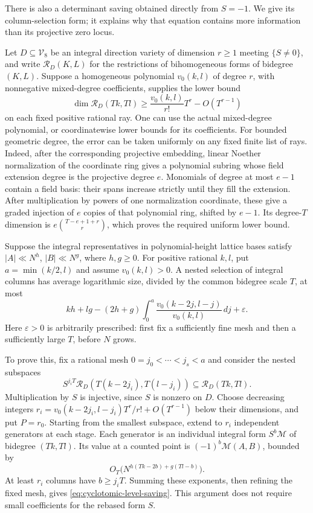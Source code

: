 There is also a determinant saving obtained directly from $S=-1$.
We give its column-selection form; it explains why that equation
contains more information than its projective zero locus.

Let $D\subseteq\mathcal V_8$ be an integral direction variety of
dimension $r\ge1$ meeting $\{S\ne0\}$, and write
$\mathcal R_D(K,L)$ for the restrictions of
bihomogeneous forms of bidegree $(K,L)$. Suppose a homogeneous
polynomial $v_0(k,l)$ of degree $r$, with nonnegative mixed-degree
coefficients, supplies the lower bound
\begin{equation}\label{eq:cyclotomic-volume-input}
 \dim\mathcal R_D(Tk,Tl)
 \ge\frac{v_0(k,l)}{r!}T^r-O(T^{r-1})
\end{equation}
on each fixed positive rational ray. One can use the actual
mixed-degree polynomial, or coordinatewise lower bounds for its
coefficients. For bounded geometric degree, the error can be taken
uniformly on any fixed finite list of rays. Indeed, after the
corresponding projective embedding, linear Noether normalization of
the coordinate ring gives a polynomial subring whose field extension
degree is the projective degree $e$. Monomials of degree at most
$e-1$ contain a field basis: their spans increase strictly until they
fill the extension. After multiplication by powers of one normalization
coordinate, these give a graded injection of $e$ copies of that
polynomial ring, shifted by $e-1$. Its degree-$T$ dimension is
$e\binom{T-e+1+r}{r}$, which proves the required uniform lower bound.

Suppose the integral representatives in polynomial-height lattice
bases satisfy $|A|\ll N^h$, $|B|\ll N^g$, where $h,g\ge0$.
For positive rational $k,l$, put $a=\min(k/2,l)$ and assume
$v_0(k,l)>0$. A nested selection of integral columns has average
logarithmic size, divided by the common bidegree scale $T$, at most
\begin{equation}\label{eq:cyclotomic-level-saving}
 kh+lg-(2h+g)\int_0^a
       \frac{v_0(k-2j,l-j)}{v_0(k,l)}\,dj+\varepsilon.
\end{equation}
Here $\varepsilon>0$ is arbitrarily prescribed: first fix a sufficiently
fine mesh and then a sufficiently large $T$, before $N$ grows.

To prove this, fix a rational mesh $0=j_0<\cdots<j_s<a$ and consider
the nested subspaces
\[
 S^{j_iT}\mathcal R_D(T(k-2j_i),T(l-j_i))
 \subseteq\mathcal R_D(Tk,Tl).
\]
Multiplication by $S$ is injective, since $S$ is nonzero on $D$.
Choose decreasing integers
$r_i=v_0(k-2j_i,l-j_i)T^r/r!+O(T^{r-1})$ below their dimensions,
and put $P=r_0$. Starting from the smallest subspace, extend to $r_i$ independent
generators at each stage. Each generator is an individual integral
form $S^b\mathcal M$ of bidegree $(Tk,Tl)$. Its value at a counted
point is $(-1)^b\mathcal M(A,B)$, bounded by
\[
 O_T\bigl(N^{h(Tk-2b)+g(Tl-b)}\bigr).
\]
At least $r_i$ columns have $b\ge j_iT$. Summing these exponents,
then refining the fixed mesh, gives
\eqref{eq:cyclotomic-level-saving}. This argument does not require
small coefficients for the rebased form $S$.

